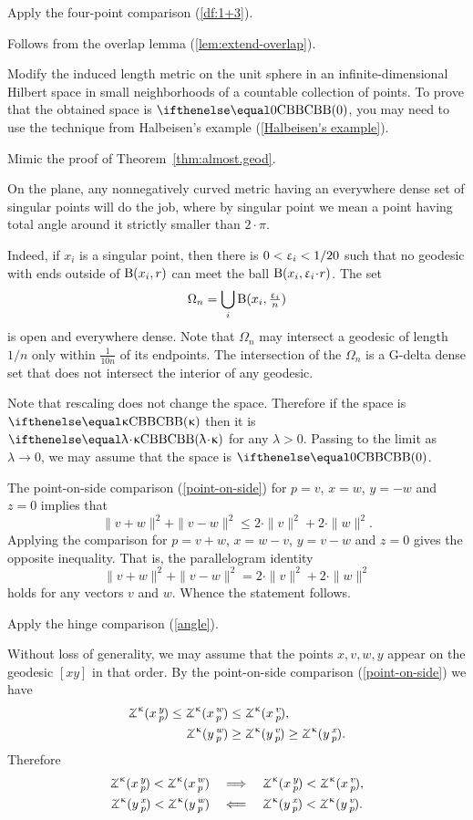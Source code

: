  Apply the four-point comparison (\ref{df:1+3}).

Follows from the overlap lemma (\ref{lem:extend-overlap}).

Modify the induced length metric on the unit sphere in an infinite-dimensional Hilbert space in small neighborhoods of a countable collection of points.
To prove that the obtained space is $\Alex0$, you may need to use the technique from Halbeisen's example (\ref{Halbeisen's example}).

 Mimic the proof of Theorem~\ref{thm:almost.geod}.

On the plane, any nonnegatively curved metric having an everywhere dense set of singular points will do the job, where 
by singular point we mean a point having total angle around it strictly smaller than $2\cdot\pi$.

Indeed, if $x_i$ is a singular point, then there is $0<\upvarepsilon_i<1/20$ such that no geodesic with ends outside of $\mathrm{B}{}(x_i,r)$ can meet the ball $\oBall(x_i,\eps_i\cdot r)$.
The set 
\[\Omega_n=\bigcup_i \mathrm{B}{}(x_i,\tfrac{\upvarepsilon_i}n)\]
is open and everywhere dense.
Note that $\Omega_n$ may intersect a geodesic  of length $1/n$ only within $\frac 1 {10n}$  of its endpoints.
The intersection of the $\Omega_n$ is a G-delta dense set that does not intersect the interior of any geodesic.

Note that rescaling does not change the space.
Therefore if the space is $\Alex\kappa$ then it is $\Alex{\lambda\cdot\kappa}$ for any $\lambda>0$.
Passing to the limit as $\lambda\to 0$, we may assume that the space is $\Alex0$.

The point-on-side comparison (\ref{point-on-side}) for $p=v$, $x=w$, $y=-w$ and $z=0$ implies that 
\[\|v+w\|^2+\|v-w\|^2\le 2\cdot\|v\|^2+2\cdot\|w\|^2.\]
Applying the comparison for 
$p=v+w$, $x=w-v$, $y=v-w$ and $z=0$ gives the opposite inequality.
That is, the parallelogram identity
\[\|v+w\|^2+\|v-w\|^2= 2\cdot\|v\|^2+2\cdot\|w\|^2\]
holds for any vectors $v$ and $w$.
Whence the statement follows.

Apply the hinge comparison (\ref{angle}).

Without loss of generality, we may assume that the points $x,v,w,y$ appear on the geodesic $[xy]$ in that order.
By the point-on-side comparison (\ref{point-on-side}) we have
\begin{align*}
\angk\kappa xyp\le\angk\kappa xwp&\le \angk\kappa xvp,
\\
\angk\kappa ywp&\ge\angk\kappa yvp\ge\angk\kappa yxp.
\end{align*}
Therefore
\begin{align*}\angk\kappa xyp<\angk\kappa xwp
\quad&\Longrightarrow\quad
\angk\kappa xyp<\angk\kappa xvp,
\\
\angk\kappa yxp<\angk\kappa ywp
\quad&\Longleftarrow\quad
\angk\kappa yxp<\angk\kappa yvp.
\end{align*}

